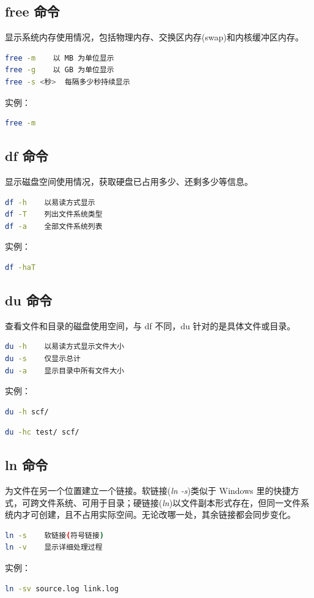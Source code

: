 \documentclass[12pt,a4paper]{ctexbook}
\begin{document}
\subsection{free 命令}
显示系统内存使用情况，包括物理内存、交换区内存(swap)和内核缓冲区内存。
\begin{lstlisting}[language=bash,title={free 常用参数}]
free -m    以 MB 为单位显示
free -g    以 GB 为单位显示
free -s <秒>  每隔多少秒持续显示
\end{lstlisting}
实例：
\begin{lstlisting}[language=bash,title={显示内存使用情况}]
    free -m
\end{lstlisting}

\subsection{df 命令}
显示磁盘空间使用情况，获取硬盘已占用多少、还剩多少等信息。
\begin{lstlisting}[language=bash,title={df 常用参数}]
df -h    以易读方式显示
df -T    列出文件系统类型
df -a    全部文件系统列表
\end{lstlisting}
实例：
\begin{lstlisting}[language=bash,title={以易读方式列出所有文件系统及其类型}]
    df -haT
\end{lstlisting}

\subsection{du 命令}
查看文件和目录的磁盘使用空间，与 df 不同，du 针对的是具体文件或目录。
\begin{lstlisting}[language=bash,title={du 常用参数}]
du -h    以易读方式显示文件大小
du -s    仅显示总计
du -a    显示目录中所有文件大小
\end{lstlisting}
实例：
\begin{lstlisting}[language=bash,title={以易读方式显示文件夹内及子文件夹大小}]
    du -h scf/
\end{lstlisting}
\begin{lstlisting}[language=bash,title={显示几个文件各自占用空间并统计总和}]
    du -hc test/ scf/
\end{lstlisting}

\subsection{ln 命令}
为文件在另一个位置建立一个链接。软链接(\textit{ln -s})类似于 Windows 里的快捷方式，可跨文件系统、可用于目录；硬链接(\textit{ln})以文件副本形式存在，但同一文件系统内才可创建，且不占用实际空间。无论改哪一处，其余链接都会同步变化。
\begin{lstlisting}[language=bash,title={ln 常用参数}]
ln -s    软链接(符号链接)
ln -v    显示详细处理过程
\end{lstlisting}
实例：
\begin{lstlisting}[language=bash,title={给文件创建软链接并显示操作信息}]
    ln -sv source.log link.log
\end{lstlisting}
\end{document}
